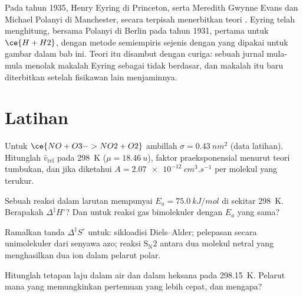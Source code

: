 \begin{history}
Pada tahun 1935, Henry Eyring di Princeton, serta Meredith Gwynne Evans dan
Michael Polanyi di Manchester, secara terpisah menerbitkan teori . Eyring telah menghitung, bersama Polanyi di Berlin pada tahun
1931,  pertama untuk $\ce{H + H2}$, dengan metode
semiempiris sejenis dengan yang dipakai untuk gambar dalam bab ini. Teori itu
disambut dengan curiga: sebuah jurnal mula-mula menolak makalah Eyring
sebagai tidak berdasar, dan makalah itu baru diterbitkan setelah fisikawan
lain menjaminnya.
\end{history}

\section{Latihan}

\begin{exercise}[$\star$]\label{exo:b3:rate-theories:1}
Untuk $\ce{NO + O3 -> NO2 + O2}$ ambillah $\sigma = \qty{0.43}{nm^2}$ (data latihan).
Hitunglah $\bar v_{\mathrm{rel}}$ pada \qty{298}{K} ($\mu = \qty{18.46}{u}$), faktor
praeksponensial menurut teori tumbukan, dan  jika diketahui
$A = \qty{2.07e-12}{cm^3.s^{-1}}$ per molekul yang terukur.
\end{exercise}

\begin{exercise}[$\star$]\label{exo:b3:rate-theories:2}
Sebuah reaksi dalam larutan mempunyai $E_a = \qty{75.0}{kJ/mol}$ di sekitar
\qty{298}{K}. Berapakah $\Delta^{\ddagger}H^\circ$? Dan untuk reaksi gas
bimolekuler dengan $E_a$ yang sama?
\end{exercise}

\begin{exercise}[$\star$]\label{exo:b3:rate-theories:3}
Ramalkan tanda $\Delta^{\ddagger}S^\circ$ untuk: sikloadisi Diels--Alder; pelepasan
 secara unimolekuler dari senyawa azo; reaksi $\mathrm{S_N2}$ antara dua
molekul netral yang menghasilkan dua ion dalam pelarut polar.
\end{exercise}

\begin{exercise}[$\star$]\label{exo:b3:rate-theories:4}
Hitunglah tetapan laju  dalam air dan dalam heksana pada
\qty{298.15}{K}. Pelarut mana yang memungkinkan pertemuan yang lebih cepat, dan
mengapa?
\end{exercise}

